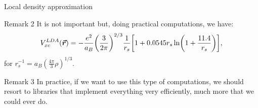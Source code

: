 \documentclass[a4paper]{article}
\begin{document}
\begin{parag}{Local density approximation}
\begin{subparag}{Remark 2}
        It is not important but, doing practical computations, we have: 
        \[V_{xc}^{LDA}\left(\bvec{r}\right) = -\frac{e^2}{a_B} \left(\frac{3}{2\pi}\right)^{2/3} \frac{1}{r_s} \left[1 + 0.0545 r_s \ln\left(1 + \frac{11.4}{r_s}\right)\right],\]
        for $r_s^{-1} = a_B \left(\frac{4\pi}{3} \rho\right)^{1/3}$.
    \end{subparag}

    \begin{subparag}{Remark 3}
        In practice, if we want to use this type of computations, we should resort to libraries that implement everything very efficiently, much more that we could ever do.
    \end{subparag}
\end{parag}
\end{document}

